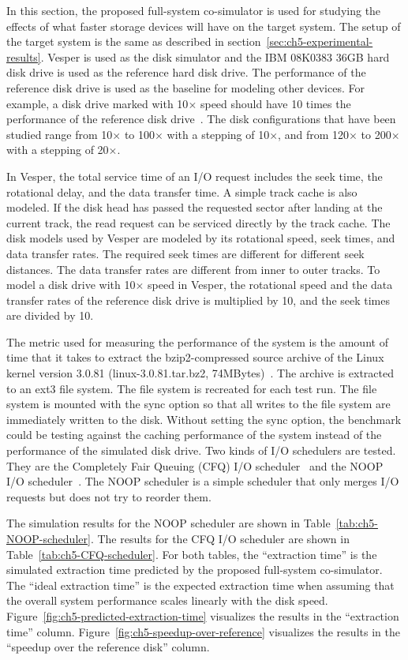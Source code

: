 In this section, the proposed full-system co-simulator is used for studying the effects of what faster storage devices will have on the target system. The setup of the target system is the same as described in section~\ref{sec:ch5-experimental-results}. Vesper is used as the disk simulator and the IBM 08K0383 36GB hard disk drive is used as the reference hard disk drive. The performance of the reference disk drive is used as the baseline for modeling other devices. For example, a disk drive marked with 10$\times$ speed should have 10 times the performance of the reference disk drive~\cite{Ruemmler:1994}. The disk configurations that have been studied range from 10$\times$ to 100$\times$ with a stepping of 10$\times$, and from 120$\times$ to 200$\times$ with a stepping of 20$\times$.

In Vesper, the total service time of an I/O request includes the seek time, the rotational delay, and the data transfer time. A simple track cache is also modeled. If the disk head has passed the requested sector after landing at the current track, the read request can be serviced directly by the track cache. The disk models used by Vesper are modeled by its rotational speed, seek times, and data transfer rates. The required seek times are different for different seek distances. The data transfer rates are different from inner to outer tracks. To model a disk drive with 10$\times$ speed in Vesper, the rotational speed and the data transfer rates of the reference disk drive is multiplied by 10, and the seek times are divided by 10.

The metric used for measuring the performance of the system is the amount of time that it takes to extract the bzip2-compressed source archive of the Linux kernel version 3.0.81 (linux-3.0.81.tar.bz2, 74MBytes)~\cite{Kernel:2013}. The archive is extracted to an ext3 file system. The file system is recreated for each test run. The file system is mounted with the sync option so that all writes to the file system are immediately written to the disk. Without setting the sync option, the benchmark could be testing against the caching performance of the system instead of the performance of the simulated disk drive. Two kinds of I/O schedulers are tested. They are the Completely Fair Queuing (CFQ) I/O scheduler~\cite{wiki:2013:CFQ} and the NOOP I/O scheduler~\cite{wiki:2015:NOOP}. The NOOP scheduler is a simple scheduler that only merges I/O requests but does not try to reorder them.

The simulation results for the NOOP scheduler are shown in Table~\ref{tab:ch5-NOOP-scheduler}. The results for the CFQ I/O scheduler are shown in Table~\ref{tab:ch5-CFQ-scheduler}. For both tables, the ``extraction time'' is the simulated extraction time predicted by the proposed full-system co-simulator. The ``ideal extraction time'' is the expected extraction time when assuming that the overall system performance scales linearly with the disk speed. Figure~\ref{fig:ch5-predicted-extraction-time} visualizes the results in the ``extraction time'' column. Figure~\ref{fig:ch5-speedup-over-reference} visualizes the results in the ``speedup over the reference disk'' column.

